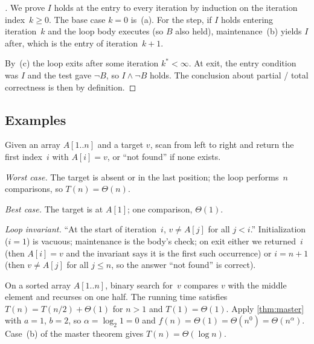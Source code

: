 \begin{proof}[]
We prove $I$ holds at the entry to every iteration by induction on the
iteration index~$k \geq 0$. The base case $k = 0$ is~(a). For the step,
if $I$ holds entering iteration~$k$ and the loop body executes (so
$B$ also held), maintenance~(b) yields $I$ after, which is the entry
of iteration~$k + 1$.

By~(c) the loop exits after some iteration $k^* < \infty$. At exit,
the entry condition was $I$ and the test gave $\neg B$, so
$I \wedge \neg B$ holds. The conclusion about partial / total
correctness is then by definition.
\end{proof}

\subsection*{Examples}

\begin{example}
\label{ex:linear-search}
Given an array $A[1..n]$ and a target $v$, scan from left to right
and return the first index~$i$ with $A[i] = v$, or ``not found'' if
none exists.

\emph{Worst case.} The target is absent or in the last position; the
loop performs~$n$ comparisons, so $T(n) = \Theta(n)$.

\emph{Best case.} The target is at $A[1]$; one comparison, $\Theta(1)$.

\emph{Loop invariant.} ``At the start of iteration~$i$, $v \neq A[j]$
for all $j < i$.'' Initialization ($i = 1$) is vacuous; maintenance is
the body's check; on exit either we returned~$i$ (then $A[i] = v$ and
the invariant says it is the first such occurrence) or $i = n + 1$
(then $v \neq A[j]$ for all $j \leq n$, so the answer ``not found''
is correct).
\end{example}

\begin{example}
\label{ex:binary-search}
On a sorted array $A[1..n]$, binary search for~$v$ compares $v$ with
the middle element and recurses on one half. The running time
satisfies $T(n) = T(n/2) + \Theta(1)$ for $n > 1$ and $T(1) = \Theta(1)$.
Apply \cref{thm:master} with $a = 1$, $b = 2$, so
$\alpha = \log_2 1 = 0$ and $f(n) = \Theta(1) = \Theta(n^0) = \Theta(n^\alpha)$.
Case~(b) of the master theorem gives $T(n) = \Theta(\log n)$.
\end{example}


